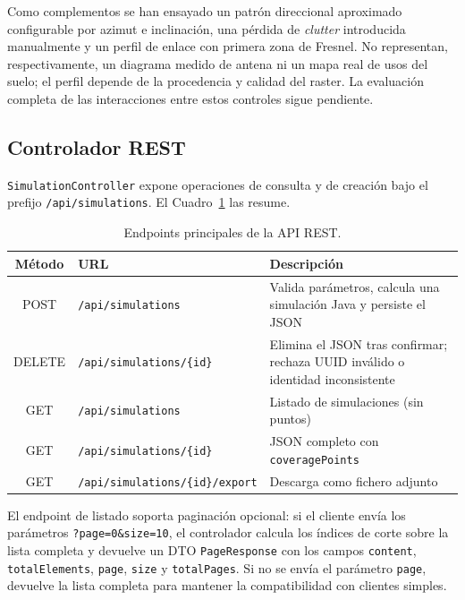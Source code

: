 Como complementos se han ensayado un patrón direccional aproximado configurable por
azimut e inclinación, una pérdida de \textit{clutter} introducida manualmente y un
perfil de enlace con primera zona de Fresnel. No representan, respectivamente, un
diagrama medido de antena ni un mapa real de usos del suelo; el perfil depende de la
procedencia y calidad del raster. La evaluación completa de las interacciones entre
estos controles sigue pendiente.

\subsection{Controlador REST}
\label{sec:backend_controller}

\texttt{SimulationController} expone operaciones de consulta y de creación bajo el prefijo
\texttt{/api/simulations}. El Cuadro~\ref{tab:impl_endpoints} las resume.

\begin{table}[H]
\centering
\caption{Endpoints principales de la API REST.}
\label{tab:impl_endpoints}
\small
\begin{tabularx}{\textwidth}{|c|>{\raggedright\arraybackslash}p{5.7cm}|X|}
\hline
\textbf{Método} & \textbf{URL} & \textbf{Descripción} \\
\hline
POST & \texttt{/api/simulations} & Valida parámetros, calcula una simulación Java y persiste el JSON \\
DELETE & \texttt{/api/simulations/\{id\}} & Elimina el JSON tras confirmar; rechaza UUID inválido o identidad inconsistente \\
GET & \texttt{/api/simulations} & Listado de simulaciones (sin puntos) \\
GET & \texttt{/api/simulations/\{id\}} & JSON completo con \texttt{coveragePoints} \\
GET & \texttt{/api/simulations/\{id\}/export} & Descarga como fichero adjunto \\
\hline
\end{tabularx}
\end{table}

El endpoint de listado soporta paginación opcional: si el cliente envía los parámetros
\texttt{?page=0\&size=10}, el controlador calcula los índices de corte sobre la lista
completa y devuelve un DTO \texttt{PageResponse} con los campos \texttt{content},
\texttt{totalElements}, \texttt{page}, \texttt{size} y \texttt{totalPages}. Si no se
envía el parámetro \texttt{page}, devuelve la lista completa para mantener la
compatibilidad con clientes simples.

